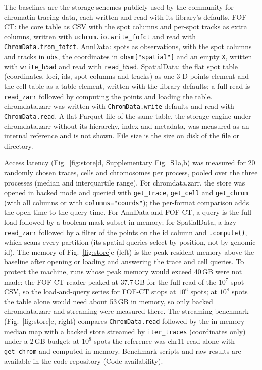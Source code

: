 \documentclass[11pt]{article}
\newcommand{\pkg}[1]{\texttt{#1}}
\begin{document}
The baselines are the storage schemes publicly used by the community for chromatin-tracing data, each written and read with its library's defaults.
FOF-CT: the core table as CSV with the spot columns and per-spot tracks as extra columns, written with \pkg{uchrom.io.write\_fofct} and read with \pkg{ChromData.from\_fofct}.
AnnData: spots as observations, with the spot columns and tracks in \pkg{obs}, the coordinates in \pkg{obsm["spatial"]} and an empty \pkg{X}, written with \pkg{write\_h5ad} and read with \pkg{read\_h5ad}.
SpatialData: the flat spot table (coordinates, loci, ids, spot columns and tracks) as one 3-D points element and the cell table as a table element, written with the library defaults; a full read is \pkg{read\_zarr} followed by computing the points and loading the table.
chromdata.zarr was written with \pkg{ChromData.write} defaults and read with \pkg{ChromData.read}.
A flat Parquet file of the same table, the storage engine under chromdata.zarr without its hierarchy, index and metadata, was measured as an internal reference and is not shown.
File size is the size on disk of the file or directory.

Access latency (Fig.~\ref{fig:store}d, Supplementary Fig.~S1a,b) was measured for 20 randomly chosen traces, cells and chromosomes per process, pooled over the three processes (median and interquartile range).
For chromdata.zarr, the store was opened in backed mode and queried with \pkg{get\_trace}, \pkg{get\_cell} and \pkg{get\_chrom} (with all columns or with \pkg{columns="coords"}); the per-format comparison adds the open time to the query time.
For AnnData and FOF-CT, a query is the full load followed by a boolean-mask subset in memory; for SpatialData, a lazy \pkg{read\_zarr} followed by a filter of the points on the id column and \pkg{.compute()}, which scans every partition (its spatial queries select by position, not by genomic id).
The memory of Fig.~\ref{fig:store}e (left) is the peak resident memory above the baseline after opening or loading and answering the trace and cell queries.
To protect the machine, runs whose peak memory would exceed 40\,GB were not made: the FOF-CT reader peaked at 37.7\,GB for the full read of the $10^{7}$-spot CSV, so the load-and-query series for FOF-CT stops at $10^{6}$ spots; at $10^{8}$ spots the table alone would need about 53\,GB in memory, so only backed chromdata.zarr and streaming were measured there.
The streaming benchmark (Fig.~\ref{fig:store}e, right) compares \pkg{ChromData.read} followed by the in-memory median map with a backed store streamed by \pkg{iter\_traces} (coordinates only) under a 2\,GB budget; at $10^{8}$ spots the reference was chr11 read alone with \pkg{get\_chrom} and computed in memory.
Benchmark scripts and raw results are available in the code repository (Code availability).
\end{document}
